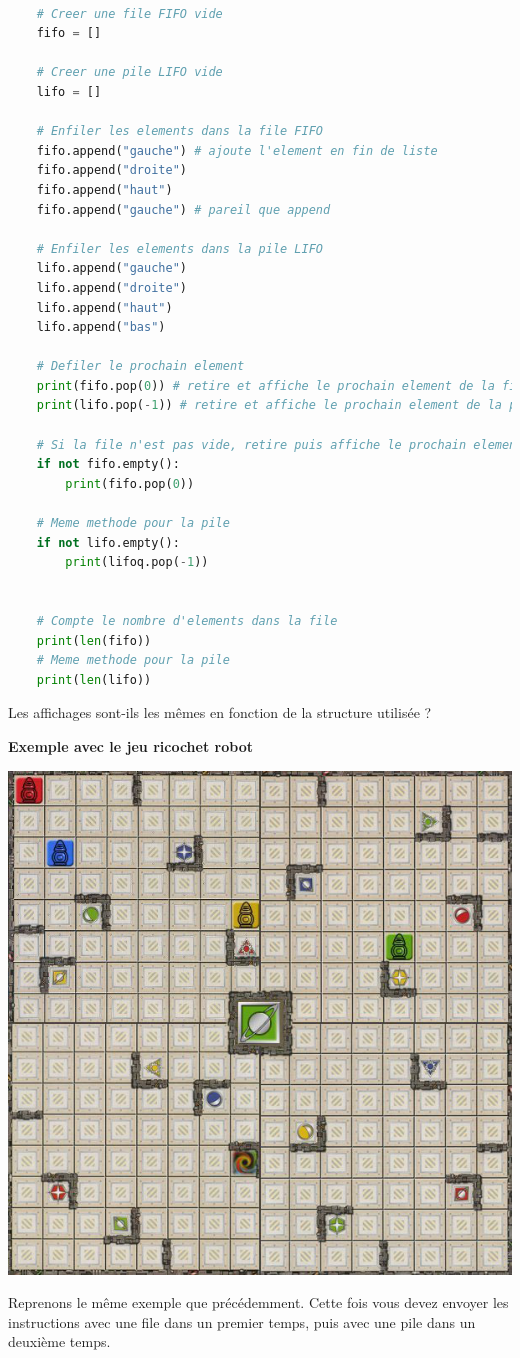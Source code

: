 \begin{lstlisting}[language=Python]

    # Creer une file FIFO vide 
    fifo = []

    # Creer une pile LIFO vide 
    lifo = []
    
    # Enfiler les elements dans la file FIFO
    fifo.append("gauche") # ajoute l'element en fin de liste
    fifo.append("droite")
    fifo.append("haut")
    fifo.append("gauche") # pareil que append

    # Enfiler les elements dans la pile LIFO
    lifo.append("gauche")
    lifo.append("droite")
    lifo.append("haut")
    lifo.append("bas") 

    # Defiler le prochain element
    print(fifo.pop(0)) # retire et affiche le prochain element de la file
    print(lifo.pop(-1)) # retire et affiche le prochain element de la pile

    # Si la file n'est pas vide, retire puis affiche le prochain element
    if not fifo.empty():
        print(fifo.pop(0)) 

    # Meme methode pour la pile
    if not lifo.empty():
        print(lifoq.pop(-1)) 


    # Compte le nombre d'elements dans la file
    print(len(fifo))
    # Meme methode pour la pile
    print(len(lifo))

\end{lstlisting}

Les affichages sont-ils les mêmes en fonction de la structure utilisée ?

\newpage

\textbf{Exemple avec le jeu ricochet robot}\\
\begin{center}
    \includegraphics[width=0.7\linewidth]{Thème 1 – Structures de données/Chapitre 1 - Interface et implémentation/BLOB/ricochet-robots-plateau}
\end{center}
Reprenons le même exemple que précédemment. Cette fois vous devez envoyer les instructions avec une file dans un premier temps, puis avec une pile dans un deuxième temps.\\


